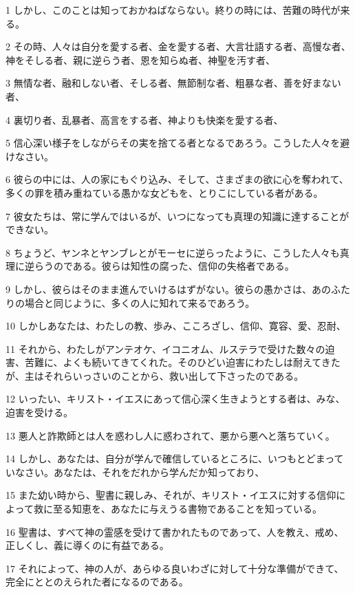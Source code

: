 \par 1 しかし、このことは知っておかねばならない。終りの時には、苦難の時代が来る。
\par 2 その時、人々は自分を愛する者、金を愛する者、大言壮語する者、高慢な者、神をそしる者、親に逆らう者、恩を知らぬ者、神聖を汚す者、
\par 3 無情な者、融和しない者、そしる者、無節制な者、粗暴な者、善を好まない者、
\par 4 裏切り者、乱暴者、高言をする者、神よりも快楽を愛する者、
\par 5 信心深い様子をしながらその実を捨てる者となるであろう。こうした人々を避けなさい。
\par 6 彼らの中には、人の家にもぐり込み、そして、さまざまの欲に心を奪われて、多くの罪を積み重ねている愚かな女どもを、とりこにしている者がある。
\par 7 彼女たちは、常に学んではいるが、いつになっても真理の知識に達することができない。
\par 8 ちょうど、ヤンネとヤンブレとがモーセに逆らったように、こうした人々も真理に逆らうのである。彼らは知性の腐った、信仰の失格者である。
\par 9 しかし、彼らはそのまま進んでいけるはずがない。彼らの愚かさは、あのふたりの場合と同じように、多くの人に知れて来るであろう。
\par 10 しかしあなたは、わたしの教、歩み、こころざし、信仰、寛容、愛、忍耐、
\par 11 それから、わたしがアンテオケ、イコニオム、ルステラで受けた数々の迫害、苦難に、よくも続いてきてくれた。そのひどい迫害にわたしは耐えてきたが、主はそれらいっさいのことから、救い出して下さったのである。
\par 12 いったい、キリスト・イエスにあって信心深く生きようとする者は、みな、迫害を受ける。
\par 13 悪人と詐欺師とは人を惑わし人に惑わされて、悪から悪へと落ちていく。
\par 14 しかし、あなたは、自分が学んで確信しているところに、いつもとどまっていなさい。あなたは、それをだれから学んだか知っており、
\par 15 また幼い時から、聖書に親しみ、それが、キリスト・イエスに対する信仰によって救に至る知恵を、あなたに与えうる書物であることを知っている。
\par 16 聖書は、すべて神の霊感を受けて書かれたものであって、人を教え、戒め、正しくし、義に導くのに有益である。
\par 17 それによって、神の人が、あらゆる良いわざに対して十分な準備ができて、完全にととのえられた者になるのである。

